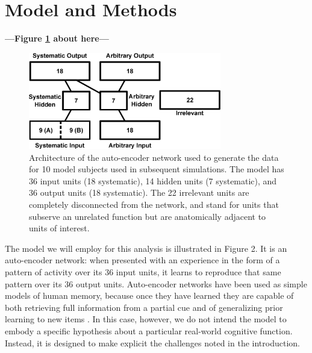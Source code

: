 \section{Model and Methods}

\begin{center}
\textbf{---Figure \ref{fig.model_outline} about here---}
\end{center}

\begin{figure}
\centering
\includegraphics[width=0.75\textwidth]{figures/model_outline.eps}
\caption{\label{fig.model_outline} Architecture of the auto-encoder network used to generate the data for 10 model subjects used in subsequent simulations. The model has 36 input units (18 systematic), 14 hidden units (7 systematic), and 36 output units (18 systematic). The 22 irrelevant units are completely disconnected from the network, and stand for units that subserve an unrelated function but are anatomically adjacent to units of interest.}
\end{figure}

The model we will employ for this analysis is illustrated in Figure 2. It is an auto-encoder network: when presented with an experience in the form of a pattern of activity over its 36 input units, it learns to reproduce that same pattern over its 36 output units. Auto-encoder networks have been used as simple models of human memory, because once they have learned they are capable of both retrieving full information from a partial cue and of generalizing prior learning to new items \cite{McClellandRumelhart85}. In this case, however, we do not intend the model to embody a specific hypothesis about a particular real-world cognitive function. Instead, it is designed to make explicit the challenges noted in the introduction. 

